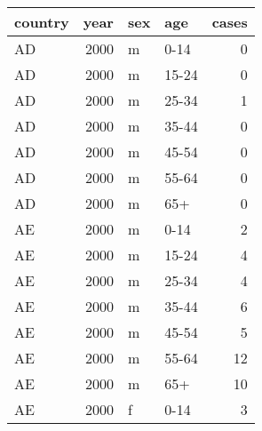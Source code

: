 \begin{tabular}{lrllr}
  \toprule
 country & year & sex & age & cases \\ 
  \midrule
  AD & 2000 & m & 0-14 &   0 \\ 
  AD & 2000 & m & 15-24 &   0 \\ 
  AD & 2000 & m & 25-34 &   1 \\ 
  AD & 2000 & m & 35-44 &   0 \\ 
  AD & 2000 & m & 45-54 &   0 \\ 
  AD & 2000 & m & 55-64 &   0 \\ 
  AD & 2000 & m & 65+ &   0 \\ 
  AE & 2000 & m & 0-14 &   2 \\ 
  AE & 2000 & m & 15-24 &   4 \\ 
  AE & 2000 & m & 25-34 &   4 \\ 
  AE & 2000 & m & 35-44 &   6 \\ 
  AE & 2000 & m & 45-54 &   5 \\ 
  AE & 2000 & m & 55-64 &  12 \\ 
  AE & 2000 & m & 65+ &  10 \\ 
  AE & 2000 & f & 0-14 &   3 \\ 
   \bottomrule
\end{tabular}
